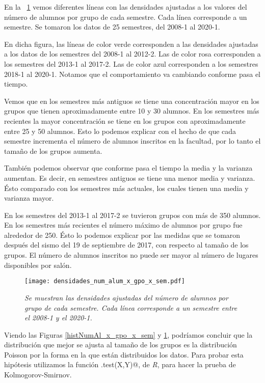 En la \figurename{~\ref{densidadesNumAl_x_gpo_x_sem}} vemos diferentes líneas con las densidades ajustadas a los valores del número de alumnos por grupo de cada semestre. Cada línea corresponde a un semestre. Se tomaron los datos de 25 semestres, del 2008-1 al 2020-1.

En dicha figura, las líneas de color verde corresponden a las densidades ajustadas a los datos de los semestres del 2008-1 al 2012-2. Las de color rosa corresponden a los semestres del 2013-1 al 2017-2. Las de color azul corresponden a los semestres 2018-1 al 2020-1. Notamos que el comportamiento va cambiando conforme pasa el tiempo.

Vemos que en los semestres más antiguos se tiene una concentración mayor en los grupos que tienen aproximadamente entre 10 y 30 alumnos. En los semestres más recientes la mayor concentración se tiene en los grupos con aproximadamente entre 25 y 50 alumnos. Esto lo podemos explicar con el hecho de que cada semestre incrementa el número de alumnos inscritos en la facultad, por lo tanto el tamaño de los grupos aumenta.

También podemos observar que conforme pasa el tiempo la media y la varianza aumentan. Es decir, en semestres antiguos se tiene una menor media y varianza. Ésto comparado con los semestres más actuales, los cuales tienen una media y varianza mayor.

En los semestres del 2013-1 al 2017-2 se tuvieron grupos con más de 350 alumnos. En los semestres más recientes el número máximo de alumnos por grupo fue alrededor de 250. Ésto lo podemos explicar por las medidas que se tomaron después del sismo del 19 de septiembre de 2017, con respecto al tamaño de los grupos. El número de alumnos inscritos no puede ser mayor al número de lugares disponibles por salón.

\begin{figure}[H]
\centering
\texttt{[image: densidades\_num\_alum\_x\_gpo\_x\_sem.pdf]} %
\caption[\textit{Densidades del número de alumnos por grupo de cada semestre}]{\textit{Se muestran las densidades ajustadas del número de alumnos por grupo de cada semestre. Cada línea corresponde a un semestre entre el 2008-1 y el 2020-1.}}\label{densidadesNumAl_x_gpo_x_sem}
\end{figure}

Viendo las Figuras \ref{histNumAl_x_gpo_x_sem} y \ref{densidadesNumAl_x_gpo_x_sem}, podríamos concluir que la distribución que mejor se ajusta al tamaño de los grupos es la distribución Poisson por la forma en la que están distribuidos los datos. Para probar esta hipótesis utilizamos la función \verb@ks.test(X,Y)@, de \textit{R}, para hacer la prueba de Kolmogorov-Smirnov.

